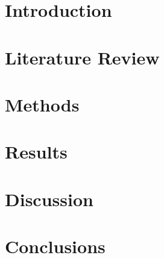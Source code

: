 \documentclass{report}
\newif\iffullsubmission
\begin{document}
    \iffullsubmission        
        \begin{singlespace}
            
            
            \tableofcontents
        \end{singlespace}

        \chapter*{Abstract}
        \addcontentsline{toc}{chapter}{Abstract}  

            
    \fi
    
    \chapter{Introduction}\label{ch:introduction}
        
        
    \chapter{Literature Review}\label{ch:lit-review}
        

    \chapter{Methods}\label{ch:methods}
        

    \chapter{Results}\label{ch:results}
        

    \chapter{Discussion}\label{ch:discussion}
        

    \chapter{Conclusions}\label{ch:conclusions}
        

    
\end{document}
